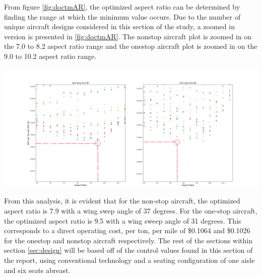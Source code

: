 \documentclass{article}
\begin{document}
        \begin{flushleft}
            From figure \ref{fig:doctmAR}, the optimized aspect ratio can be
            determined by finding the range at which the minimum value occurs.
            Due to the number of unique aircraft designs considered in this
            section of the study, a zoomed in version is presented in
            \ref{fig:doctmAR}. The nonstop aircraft plot is zoomed in on the 7.0
            to 8.2 aspect ratio range and the onestop aircraft plot is zoomed in
            on the 9.0 to 10.2 aspect ratio range.
        \end{flushleft}

        \begin{center}
            \includegraphics[scale=0.244]{DOCTM v Sweep Angle Zoom.PNG}
            \label{fig:doctmARzoom}%
        \end{center}

        \begin{flushleft}
            From this analysis, it is evident that for the non-stop aircraft,
            the optimized aspect ratio is 7.9 with a wing swep angle of 37
            degrees. For the one-stop aircraft, the optimized aspect ratio is
            9.5 with a wing sweep angle of 31 degrees. This corresponds to a
            direct operating cost, per ton, per mile of \$0.1064 and \$0.1026
            for the onestop and nonstop aircraft respectively. The rest of the
            sections within section \ref{sec:design} will be based off of the
            control values found in this section of the report, using
            conventional technology and a seating configuration of one aisle and
            six seats abreast.
        \end{flushleft}
\end{document}
